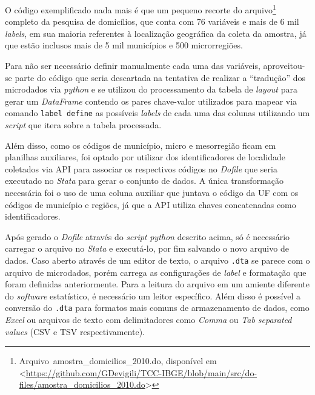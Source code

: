     O código exemplificado nada mais é que um pequeno recorte do arquivo\footnote{Arquivo\ amostra\_domicilios\_2010.do, disponível em <\url{https://github.com/GDevigili/TCC-IBGE/blob/main/src/do-files/amostra_domicilios_2010.do}>} completo da pesquisa de domicílios, que conta com 76 variáveis e mais de 6 mil \textit{labels}, em sua maioria referentes à localização geográfica da coleta da amostra, já que estão inclusos mais de 5 mil municípios e 500 microrregiões.

    Para não ser necessário definir manualmente cada uma das variáveis, aproveitou-se parte do código que seria descartada na tentativa de realizar a ``tradução'' dos microdados via \textit{python} e se utilizou do processamento da tabela de \textit{layout} para gerar um \textit{DataFrame} contendo os pares chave-valor utilizados para mapear via comando \verb|label define| as possíveis \textit{labels} de cada uma das colunas utilizando um \textit{script} que itera sobre a tabela processada.

    Além disso, como os códigos de município, micro e mesorregião ficam em planilhas auxiliares, foi optado por utilizar dos identificadores de localidade coletados via API para associar os respectivos códigos no \textit{Dofile} que seria executado no \textit{Stata} para gerar o conjunto de dados. A única transformação necessária foi o uso de uma coluna auxiliar que juntava o código da UF com os códigos de município e regiões, já que a API utiliza chaves concatenadas como identificadores.

    Após gerado o \textit{Dofile} através do \textit{script} \textit{python} descrito acima, só é necessário carregar o arquivo no \textit{Stata} e executá-lo, por fim salvando o novo arquivo de dados. Caso aberto através de um editor de texto, o arquivo \verb|.dta| se parece com o arquivo de microdados, porém carrega as configurações de \textit{label} e formatação que foram definidas anteriormente. Para a leitura do arquivo em um amiente diferente do \textit{software} estatístico, é necessário um leitor específico. Além disso é possível a conversão do \verb|.dta| para formatos mais comuns de armazenamento de dados, como \textit{Excel} ou arquivos de texto com delimitadores como \textit{Comma} ou \textit{Tab separated values} (CSV e TSV respectivamente). 
    
   
